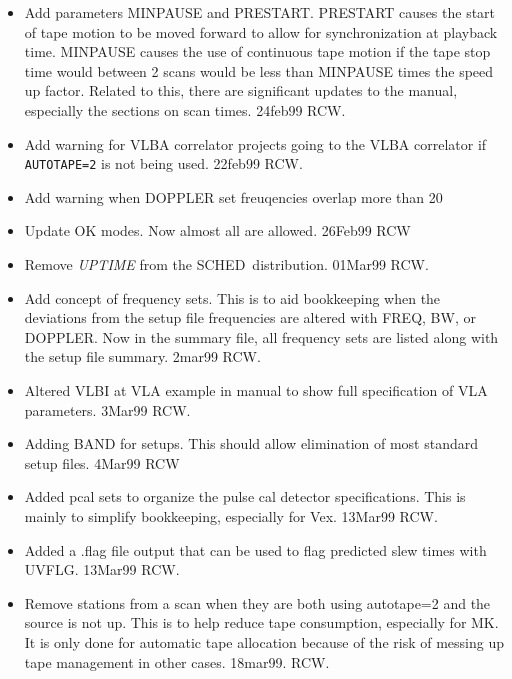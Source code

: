 \documentclass{report}
\newcommand{\schedb}{{\sc SCHED~}}
\begin{document}
\begin{itemize}
\item  Add parameters MINPAUSE and PRESTART.  PRESTART causes the
       start of tape motion to be moved forward to allow for
       synchronization at playback time.  MINPAUSE causes the
       use of continuous tape motion if the tape stop time would
       between 2 scans would be less than MINPAUSE times the speed
       up factor.  Related to this, there are significant updates
       to the manual, especially the sections on scan times.
       24feb99 RCW.

\item  Add warning for VLBA correlator projects going to the VLBA
       correlator if {\tt AUTOTAPE=2} is not being used.  22feb99 RCW.

\item  Add warning when DOPPLER set freuqencies overlap more than
       20%

\item  Update OK modes.  Now almost all are allowed.  26Feb99 RCW

\item  Remove {\sl UPTIME} from the \schedb distribution.  01Mar99 RCW.

\item  Add concept of frequency sets.  This is to aid bookkeeping
       when the deviations from the setup file frequencies are altered
       with FREQ, BW, or DOPPLER.  Now in the summary file, all
       frequency sets are listed along with the setup file summary.
       2mar99 RCW.

\item  Altered VLBI at VLA example in manual to show full specification
       of VLA parameters.  3Mar99 RCW.

\item  Adding BAND for setups.  This should allow elimination of
       most standard setup files.  4Mar99 RCW

\item  Added pcal sets to organize the pulse cal detector specifications.
       This is mainly to simplify bookkeeping, especially for Vex.
       13Mar99  RCW.

\item  Added a .flag file output that can be used to flag predicted slew
       times with UVFLG.  13Mar99 RCW.

\item  Remove stations from a scan when they are both using autotape=2
       and the source is not up.  This is to help reduce tape
       consumption, especially for MK.  It is only done for automatic
       tape allocation because of the risk of messing up tape
       management in other cases.   18mar99.  RCW.


\end{itemize}
\end{document}
